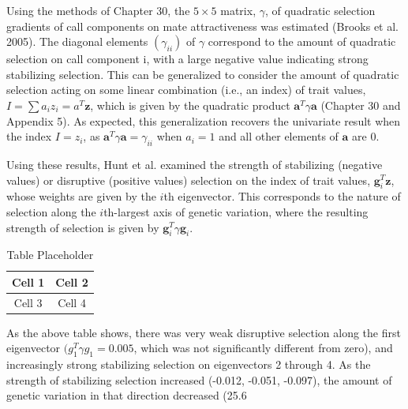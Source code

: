 \documentclass{article}
\begin{document}
Using the methods of Chapter 30, the  $ 5 \times 5 $ matrix,  $ \gamma $, of quadratic selection gradients of call components on mate attractiveness was estimated (Brooks et al. 2005). The diagonal elements  $ (\gamma_{ii}) $ of  $ \gamma $ correspond to the amount of quadratic selection on call component i, with a large negative value indicating strong stabilizing selection. This can be generalized to consider the amount of quadratic selection acting on some linear combination (i.e., an index) of trait values,  $ I = \sum a_i z_i = a^T \mathbf{z} $, which is given by the quadratic product  $ \mathbf{a}^T \gamma \mathbf{a} $ (Chapter 30 and Appendix 5). As expected, this generalization recovers the univariate result when the index  $ I = z_i $, as  $ \mathbf{a}^T \gamma \mathbf{a} = \gamma_{ii} $ when  $ a_i = 1 $ and all other elements of  $ \mathbf{a} $ are 0.

Using these results, Hunt et al. examined the strength of stabilizing (negative values) or disruptive (positive values) selection on the index of trait values,  $ \mathbf{g}_i^T \mathbf{z} $, whose weights are given by the  $ i $th eigenvector. This corresponds to the nature of selection along the  $ i $th-largest axis of genetic variation, where the resulting strength of selection is given by  $ \mathbf{g}_i^T \gamma \mathbf{g}_i $.

\begin{table}[h]
\centering
\begin{tabular}{|c|c|}
\hline
Cell 1 & Cell 2 \\
\hline
Cell 3 & Cell 4 \\
\hline
\end{tabular}
\caption{Table Placeholder}
\end{table}

As the above table shows, there was very weak disruptive selection along the first eigenvector  $ (g_1^T \gamma g_1 = 0.005 $, which was not significantly different from zero), and increasingly strong stabilizing selection on eigenvectors 2 through 4. As the strength of stabilizing selection increased (-0.012, -0.051, -0.097), the amount of genetic variation in that direction decreased (25.6%
\end{document}
